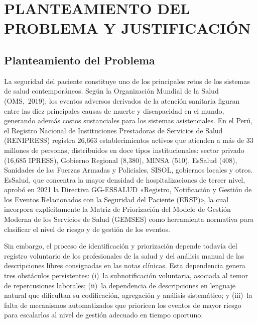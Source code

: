 
\chapter{PLANTEAMIENTO DEL PROBLEMA Y JUSTIFICACIÓN}
\label{cap:problema}

\section{Planteamiento del Problema}
\label{sec:planteamiento}

La seguridad del paciente constituye uno de los principales retos de los sistemas de salud contemporáneos. Según la Organización Mundial de la Salud \mbox{(OMS, 2019)}, los eventos adversos derivados de la atención sanitaria figuran entre las diez principales causas de muerte y discapacidad en el mundo, generando además costos sustanciales para los sistemas asistenciales. En el Perú, el Registro Nacional de Instituciones Prestadoras de Servicios de Salud (RENIPRESS) registra 26{,}663 establecimientos activos que atienden a más de 33 millones de personas, distribuidos en doce tipos institucionales: sector privado (16{,}685 IPRESS), Gobierno Regional (8{,}380), MINSA (510), EsSalud (408), Sanidades de las Fuerzas Armadas y Policiales, SISOL, gobiernos locales y otros. EsSalud, que concentra la mayor densidad de hospitalizaciones de tercer nivel, aprobó en 2021 la Directiva GG-ESSALUD «Registro, Notificación y Gestión de los Eventos Relacionados con la Seguridad del Paciente (ERSP)», la cual incorpora explícitamente la Matriz de Priorización del Modelo de Gestión Moderna de los Servicios de Salud (GEMSES) como herramienta normativa para clasificar el nivel de riesgo y de gestión de los eventos.

Sin embargo, el proceso de identificación y priorización depende todavía del registro voluntario de los profesionales de la salud y del análisis manual de las descripciones libres consignadas en las notas clínicas. Esta dependencia genera tres obstáculos persistentes: (i)~la subnotificación voluntaria, asociada al temor de repercusiones laborales; (ii)~la dependencia de descripciones en lenguaje natural que dificultan su codificación, agregación y análisis sistemático; y (iii)~la falta de mecanismos automatizados que prioricen los eventos de mayor riesgo para escalarlos al nivel de gestión adecuado en tiempo oportuno.


